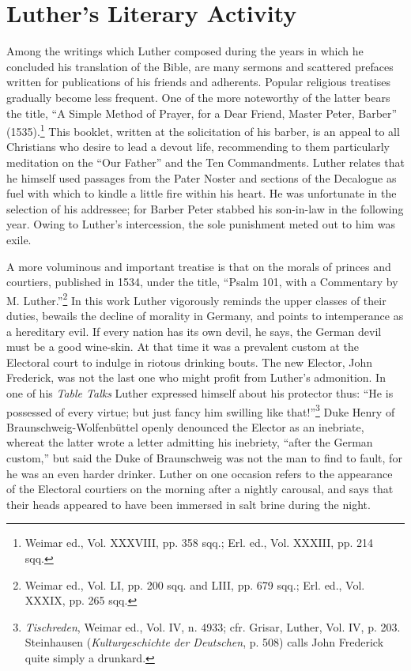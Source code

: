 \section{Luther’s Literary Activity}

Among the writings which Luther composed during the years in
which he concluded his translation of the Bible, are many sermons
and scattered prefaces written for publications of his friends and
adherents. Popular religious treatises gradually become less frequent.
One of the more noteworthy of the latter bears the title, “A Simple Method
of Prayer, for a Dear Friend, Master Peter, Barber”
(1535).\footnote{Weimar ed., Vol. XXXVIII, pp. 358 sqq.; Erl. ed., Vol. XXXIII, pp. 214 sqq.}
 This booklet, written at the solicitation of his barber, is an
appeal to all Christians who desire to lead a devout life, recommending
to them particularly meditation on the “Our Father” and the Ten
Commandments. Luther relates that he himself used passages from the
Pater Noster and sections of the Decalogue as fuel with which to
kindle a little fire within his heart. He was unfortunate in the selection
of his addressee; for Barber Peter stabbed his son-in-law in the
following year. Owing to Luther’s intercession, the sole punishment
meted out to him was exile.

A more voluminous and important treatise is that on the morals of
princes and courtiers, published in 1534, under the title, “Psalm 101,
with a Commentary by M. Luther.”\footnote
{Weimar ed., Vol. LI, pp. 200 sqq. and LIII, pp. 679 sqq.; Erl. ed., Vol. XXXIX, pp.
265 sqq.}
In this work Luther vigorously reminds
the upper classes of their duties, bewails the decline
of morality in Germany, and points to intemperance as a hereditary
evil. If every nation has its own devil, he says, the German devil must
be a good wine-skin. At that time it was a prevalent custom at the
Electoral court to indulge in riotous drinking bouts. The new Elector,
John Frederick, was not the last one who might profit from Luther’s
admonition. In one of his \textit{Table Talks} Luther expressed himself about
his protector thus: “He is possessed of every virtue; but just fancy
him swilling like that!”\footnote
{\textit{Tischreden}, Weimar ed., Vol. IV, n. 4933; cfr. Grisar, Luther, Vol. IV, p. 203.
Steinhausen (\textit{Kulturgeschichte der Deutschen}, p. 508) calls John Frederick quite simply a
drunkard.}
Duke Henry of Braunschweig-Wolfenbüttel
openly denounced the Elector as an inebriate, whereat the latter
wrote a letter admitting his inebriety, ``after the German custom,''
but said the Duke of Braunschweig was not the man to find to fault,
for he was an even harder drinker. Luther on one occasion refers to the
appearance of the Electoral courtiers on the morning after a nightly
carousal, and says that their heads appeared to have been immersed in
salt brine during the night.

